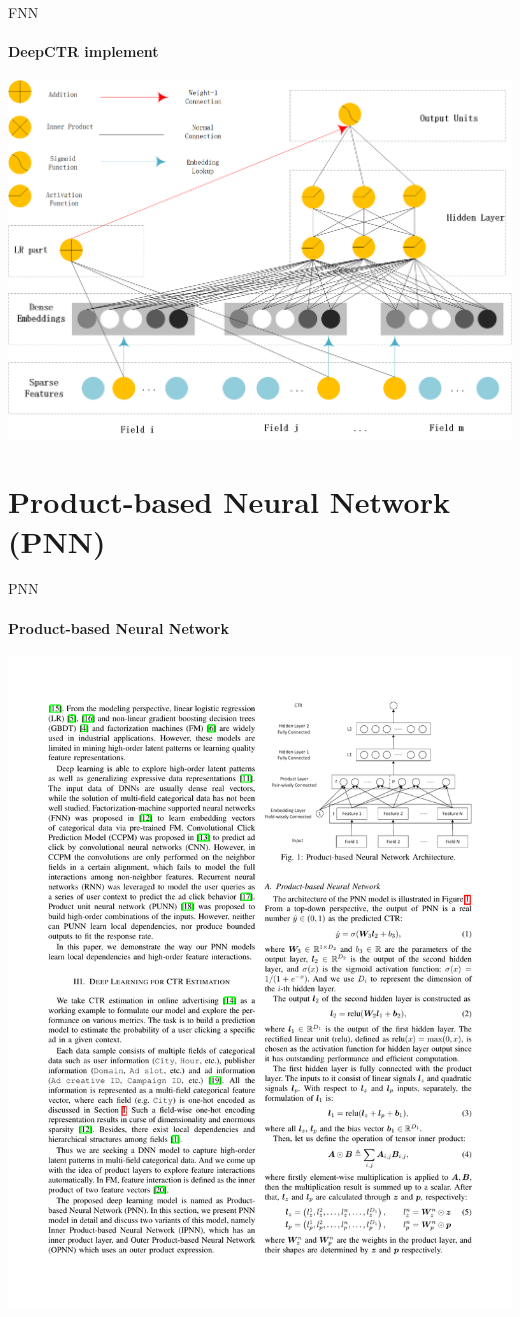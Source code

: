 \documentclass{ctexbeamer}
\begin{document}
\begin{frame}{FNN}
	\framesubtitle{DeepCTR implement}
	\begin{center}
		\includegraphics[width=.9\textwidth]{FNN}
	\end{center}
\end{frame}

\section{Product-based Neural Network (PNN)}
\begin{frame}{PNN}
	\framesubtitle{Product-based Neural Network }
	\begin{center}
		\includegraphics[width=.85\textwidth]{framework/pnn}
	\end{center}
\end{frame}
\end{document}
